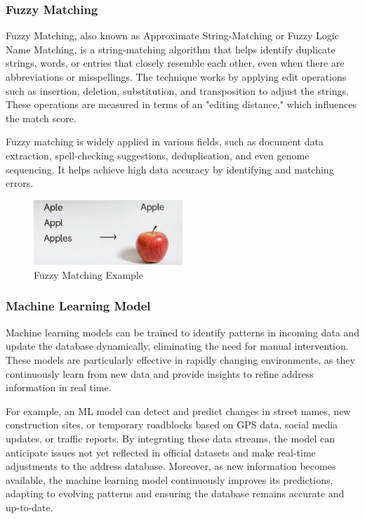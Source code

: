         \subsubsection{Fuzzy Matching}
        Fuzzy Matching, also known as Approximate String-Matching or Fuzzy Logic Name Matching, is a string-matching algorithm that helps identify duplicate strings, words, or entries that closely resemble each other, even when there are abbreviations or misspellings. The technique works by applying edit operations such as insertion, deletion, substitution, and transposition to adjust the strings. These operations are measured in terms of an "editing distance," which influences the match score.\blankLine
        
        Fuzzy matching is widely applied in various fields, such as document data extraction, spell-checking suggestions, deduplication, and even genome sequencing. It helps achieve high data accuracy by identifying and matching errors. \autocite{Nieters2024Dec}

        \begin{figure}[H]
            \centering
            \includegraphics[width=0.5\textwidth]{images/AdminPanel/FuzzyMatching.png}
            \caption{Fuzzy Matching Example}
            \label{fig:fuzzy-matching}
        \end{figure}

        \subsubsection{Machine Learning Model}
        Machine learning models can be trained to identify patterns in incoming data and update the database dynamically, eliminating the need for manual intervention. These models are particularly effective in rapidly changing environments, as they continuously learn from new data and provide insights to refine address information in real time.\blankLine

        For example, an ML model can detect and predict changes in street names, new construction sites, or temporary roadblocks based on GPS data, social media updates, or traffic reports. By integrating these data streams, the model can anticipate issues not yet reflected in official datasets and make real-time adjustments to the address database. Moreover, as new information becomes available, the machine learning model continuously improves its predictions, adapting to evolving patterns and ensuring the database remains accurate and up-to-date. \autocite{Encora2023Nov}
        
